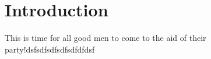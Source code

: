 \section{Introduction}
This is time for all good men to come to the aid of their party!dsfsdfsdfsdfsdfdfdsf

